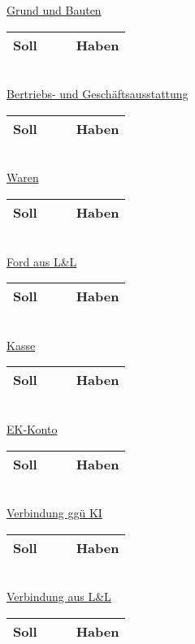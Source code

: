 \documentclass[paper=a4, fontsize=11pt]{scrartcl}
\numberwithin{equation}{section}
\numberwithin{figure}{section}
\numberwithin{table}{section}
\begin{document}
\underline{Grund und Bauten}

\begin{tabular}{cc|cc}
\hline
Soll & & & Haben \\
\hline
\end{tabular}
\\

\underline{Bertriebs- und Geschäftsausstattung}

\begin{tabular}{cc|cc}
\hline
Soll & & & Haben \\
\hline
\end{tabular}
\\

\underline{Waren}

\begin{tabular}{cc|cc}
\hline
Soll & & & Haben \\
\hline
\end{tabular}
\\

\underline{Ford aus L&L}

\begin{tabular}{cc|cc}
\hline
Soll & & & Haben \\
\hline
\end{tabular}
\\

\underline{Kasse}

\begin{tabular}{cc|cc}
\hline
Soll & & & Haben \\
\hline
\end{tabular}
\\

\underline{EK-Konto}

\begin{tabular}{cc|cc}
\hline
Soll & & & Haben \\
\hline
\end{tabular}
\\

\underline{Verbindung ggü KI}

\begin{tabular}{cc|cc}
\hline
Soll & & & Haben \\
\hline
\end{tabular}
\\

\underline{Verbindung aus L&L}

\begin{tabular}{cc|cc}
\hline
Soll & & & Haben \\
\hline
\end{tabular}
\\
\end{document}
